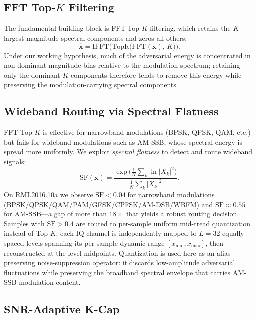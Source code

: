 \subsection{FFT Top-$K$ Filtering}

The fundamental building block is FFT Top-$K$ filtering, which retains the
$K$ largest-magnitude spectral components and zeros all others:
\begin{equation}
  \hat{\mathbf{x}} = \text{IFFT}\!\bigl(\mathrm{TopK}\bigl(\text{FFT}(\mathbf{x}),\, K\bigr)\bigr).
  \label{eq:topk}
\end{equation}
Under our working hypothesis, much of the adversarial energy is concentrated
in non-dominant magnitude bins relative to the modulation spectrum; retaining
only the dominant $K$ components therefore tends to remove this energy while
preserving the modulation-carrying spectral components.

\subsection{Wideband Routing via Spectral Flatness}

FFT Top-$K$ is effective for narrowband modulations (BPSK, QPSK, QAM, etc.)
but fails for wideband modulations such as AM-SSB, whose spectral energy is
spread more uniformly. We exploit \emph{spectral flatness} to detect and
route wideband signals:
\begin{equation}
  \text{SF}(\mathbf{x}) = \frac{\exp\!\bigl(\tfrac{1}{N}\sum_{k}\ln |X_k|^2\bigr)}
                               {\tfrac{1}{N}\sum_{k}|X_k|^2}.
  \label{eq:flatness}
\end{equation}
On RML2016.10a we observe $\text{SF} < 0.04$ for narrowband modulations
(BPSK/QPSK/QAM/PAM/GFSK/CPFSK/AM-DSB/WBFM) and $\text{SF} \approx 0.55$
for AM-SSB---a gap of more than $18\times$ that yields a robust routing
decision. Samples with $\text{SF} > 0.4$ are routed to per-sample
uniform mid-tread quantization instead of Top-$K$: each IQ channel is
independently mapped to $L = 32$ equally spaced levels spanning its
per-sample dynamic range $[x_{\min}, x_{\max}]$, then reconstructed at
the level midpoints. Quantization is used here as an alias-preserving
noise-suppression operator: it discards low-amplitude adversarial
fluctuations while preserving the broadband spectral envelope that
carries AM-SSB modulation content.

\subsection{SNR-Adaptive K-Cap}


